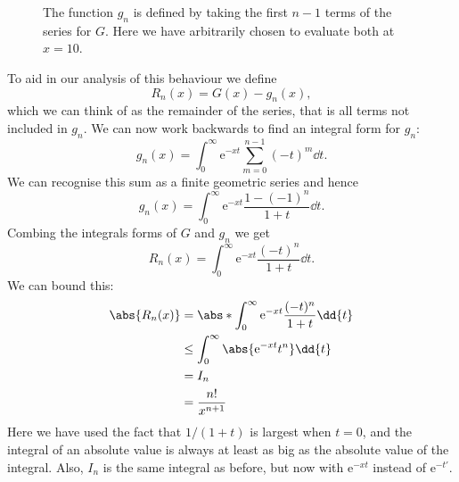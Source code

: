 \documentclass[fleqn]{NotesClass}
\newcommand*{\e}{\mathrm{e}}
\begin{document}
    \begin{figure}
        \caption{The function \(g_n\) is defined by taking the first \(n-1\) terms of the series for \(G\). Here we have arbitrarily chosen to evaluate both at \(x = 10\).}
        \label{fig:asymptotic expansion}
    \end{figure}
    
    To aid in our analysis of this behaviour we define
    \begin{equation}
        R_n(x) = G(x) - g_n(x),
    \end{equation}
    which we can think of as the remainder of the series, that is all terms not included in \(g_n\).
    We can now work backwards to find an integral form for \(g_n\):
    \begin{equation}
        g_n(x) = \int_0^{\infty} \e^{-xt}\sum_{m=0}^{n-1} (-t)^{m}\dd{t}.
    \end{equation}
    We can recognise this sum as a finite geometric series and hence
    \begin{equation}
        g_n(x) = \int_0^{\infty} \e^{-xt} \frac{1 - (-1)^n}{1 + t}\dd{t}.
    \end{equation}
    Combing the integrals forms of \(G\) and \(g_n\) we get
    \begin{equation}
        R_n(x) = \int_0^{\infty} \e^{-xt} \frac{(-t)^n}{1 + t}\dd{t}.
    \end{equation}
    We can bound this:
    \begin{align}
        \abs{R_n(x)} &= \abs*{\int_0^{\infty} \e^{-xt} \frac{(-t)^n}{1 + t}\dd{t}}\\
        &\le \int_0^{\infty} \abs{\e^{-xt}t^n} \dd{t}\\
        &= I_n\\
        &= \frac{n!}{x^{n+1}}
    \end{align}
    Here we have used the fact that \(1/(1 + t)\) is largest when \(t = 0\), and the integral of an absolute value is always at least as big as the absolute value of the integral.
    Also, \(I_n\) is the same integral as before, but now with \(\e^{-xt}\) instead of \(\e^{-t'}\).
    
\end{document}
